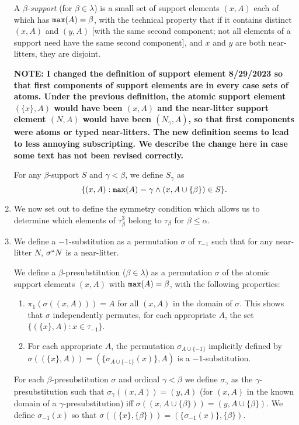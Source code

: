 \documentclass[12pt]{article}
\begin{document}
\begin{enumerate}
A {\em $\beta$-support\/} (for $\beta \in \lambda$) is a small set of support elements $(x,A)$ each of which has ${\tt max}(A)=\beta$, with the technical property that if it contains distinct $(x,A)$ and $(y,A)$ [with the same second component;  not all elements of a support need have the same second component], and $x$ and $y$ are both near-litters, they are disjoint.

{\bf NOTE:  I changed the definition of support element 8/29/2023 so that first components of support elements are in every case sets of atoms.
Under the previous definition, the atomic support element $(\{x\},A)$ would have been $(x,A)$ and the near-litter support element $(N,A)$ would have been $(N_\gamma,A)$, so
that first components were atoms or typed near-litters.  The new definition seems to lead to less annoying subscripting.  We describe the change here in case some text has not been revised correctly.}

For any $\beta$-support $S$ and $\gamma<\beta$, we define $S_\gamma$ as $$\{(x,A):{\tt max}(A)=\gamma \wedge (x,A\cup \{\beta\}) \in S\}.$$

\item  We now set out to define the symmetry condition which allows us to determine which elements of $\tau^3_\beta$ belong to $\tau_\beta$ for $\beta\leq \alpha$.

\item We define a $-1$-substitution as a permutation $\sigma$ of $\tau_{-1}$ such that for any near-litter $N$, $\sigma``N$ is a near-litter.

We define a $\beta$-presubstitution ($\beta\in \lambda$) as a permutation $\sigma$ of the atomic support elements $(x,A)$ with ${\tt max}(A)=\beta$, with the following properties:

\begin {enumerate}

\item $\pi_1(\sigma((x,A))) = A$ for all $(x,A)$ in the domain of $\sigma$.  This shows that $\sigma$ independently permutes, for each appropriate $A$, the set $\{(\{x\},A):x \in \tau_{-1}\}$.

\item For each appropriate $A$, the permutation $\sigma_{A\cup \{-1\}}$ implicitly defined by $\sigma((\{x\},A)) = (\{\sigma_{A\cup \{-1\}}(x)\},A)$ is a $-1$-substitution.

\end{enumerate}

For each $\beta$-presubstitution $\sigma$ and ordinal $\gamma<\beta$ we define $\sigma_\gamma$ as the $\gamma$-presubstitution such that $\sigma_\gamma((x,A)) = (y,A)$ (for $(x,A)$ in the known domain of a $\gamma$-presubstitution) iff $\sigma((x,A \cup \{\beta\})) = (y,A \cup \{\beta\})$.
We define $\sigma_{-1}(x)$ so that $\sigma((\{x\},\{\beta\})) = (\{\sigma_{-1}(x)\},\{\beta\})$.


\end{enumerate}
\end{document}
